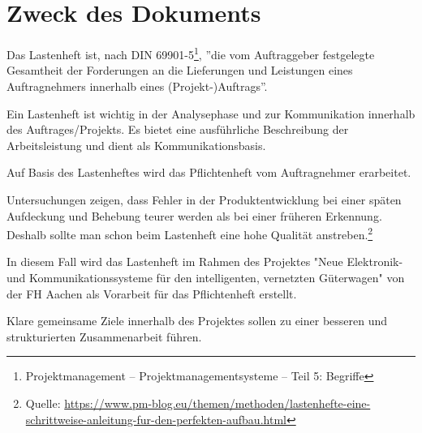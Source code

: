 \section*{Zweck des Dokuments}
Das Lastenheft ist, nach DIN 69901-5\footnote{Projektmanagement – Projektmanagementsysteme – Teil 5: Begriffe}, ''die vom Auftraggeber festgelegte Gesamtheit der Forderungen an die Lieferungen und Leistungen eines Auftragnehmers innerhalb eines (Projekt-)Auftrags''.\par
Ein Lastenheft ist wichtig in der Analysephase und zur Kommunikation innerhalb des Auftrages/Projekts. Es bietet eine ausführliche Beschreibung der Arbeitsleistung und dient als Kommunikationsbasis.\par
Auf Basis des Lastenheftes wird das Pflichtenheft vom Auftragnehmer erarbeitet.\par
Untersuchungen zeigen, dass Fehler in der Produktentwicklung bei einer späten Aufdeckung und Behebung teurer werden als bei einer früheren Erkennung. Deshalb sollte man schon beim Lastenheft eine hohe Qualität anstreben.\footnote{Quelle: \url{https://www.pm-blog.eu/themen/methoden/lastenhefte-eine-schrittweise-anleitung-fur-den-perfekten-aufbau.html} }\par
In diesem Fall wird das Lastenheft im Rahmen des Projektes "Neue Elektronik- und Kommunikationssysteme für den intelligenten, vernetzten Güterwagen" von der FH Aachen als Vorarbeit für das Pflichtenheft erstellt. \par
Klare gemeinsame Ziele innerhalb des Projektes sollen zu einer besseren und strukturierten Zusammenarbeit führen.

